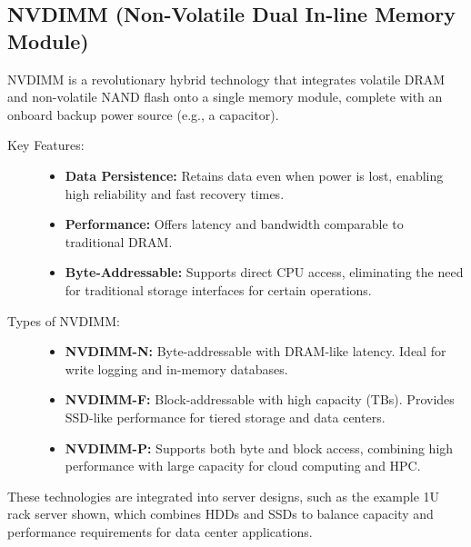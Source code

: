 \subsection{NVDIMM (Non-Volatile Dual In-line Memory Module)}
NVDIMM is a revolutionary hybrid technology that integrates volatile DRAM and non-volatile NAND flash onto a single memory module, complete with an onboard backup power source (e.g., a capacitor).

\begin{description}
    \item[Key Features:]
    \begin{itemize}
        \item \textbf{Data Persistence:} Retains data even when power is lost, enabling high reliability and fast recovery times.
        \item \textbf{Performance:} Offers latency and bandwidth comparable to traditional DRAM.
        \item \textbf{Byte-Addressable:} Supports direct CPU access, eliminating the need for traditional storage interfaces for certain operations.
    \end{itemize}
    \item[Types of NVDIMM:]
    \begin{itemize}
        \item \textbf{NVDIMM-N:} Byte-addressable with DRAM-like latency. Ideal for write logging and in-memory databases.
        \item \textbf{NVDIMM-F:} Block-addressable with high capacity (TBs). Provides SSD-like performance for tiered storage and data centers.
        \item \textbf{NVDIMM-P:} Supports both byte and block access, combining high performance with large capacity for cloud computing and HPC.
    \end{itemize}
\end{description}
These technologies are integrated into server designs, such as the example 1U rack server shown, which combines HDDs and SSDs to balance capacity and performance requirements for data center applications.
